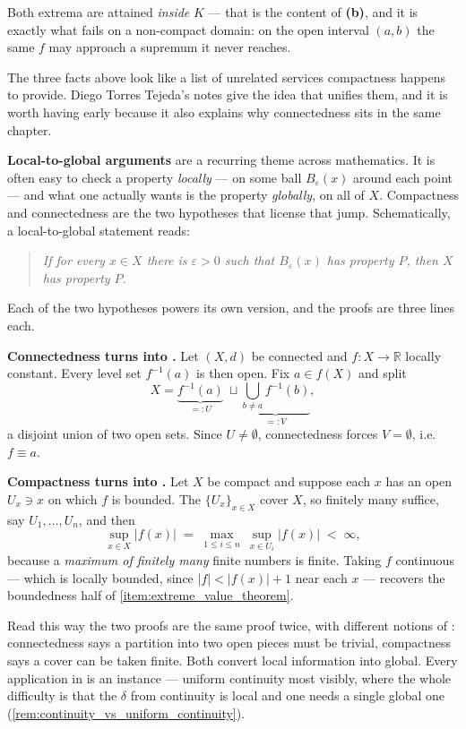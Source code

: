 Both extrema are attained \emph{inside} $K$ --- that is the content of \textbf{(b)}, and it is
exactly what fails on a non-compact domain: on the open interval $(a,b)$ the same $f$ may
approach a supremum it never reaches.

\begin{remark}
\label{rem:local_to_global}
The three facts above look like a list of unrelated services compactness happens to provide.
Diego Torres Tejeda's notes give the idea that unifies them, and it is worth having early
because it also explains why connectedness sits in the same chapter.

\textbf{Local-to-global arguments} are a recurring theme across mathematics. It is often easy to
check a property \emph{locally} --- on some ball $B_\varepsilon(x)$ around each point --- and
what one actually wants is the property \emph{globally}, on all of $X$. Compactness and
connectedness are the two hypotheses that license that jump. Schematically, a local-to-global
statement reads:
\begin{quote}
\itshape
If for every $x \in X$ there is $\varepsilon>0$ such that $B_\varepsilon(x)$ has property $P$,
then $X$ has property $P$.
\end{quote}
Each of the two hypotheses powers its own version, and the proofs are three lines each.

\textbf{Connectedness turns  into .} Let $(X,d)$ be connected
and $f : X \to \mathbb{R}$ locally constant. Every level set $f^{-1}(a)$ is then open. Fix
$a \in f(X)$ and split
\[X = \underbrace{f^{-1}(a)}_{=:U} \ \sqcup \underbrace{\bigcup_{b \neq a}f^{-1}(b)}_{=:V},\]
a disjoint union of two open sets. Since $U \neq \emptyset$, connectedness forces $V=\emptyset$,
i.e.\ $f \equiv a$.

\textbf{Compactness turns  into .} Let $X$ be compact and
suppose each $x$ has an open $U_x \ni x$ on which $f$ is bounded. The $\{U_x\}_{x\in X}$ cover
$X$, so finitely many suffice, say $U_1,\dots,U_n$, and then
\[\sup_{x \in X}|f(x)| \;=\; \max_{1\leq i\leq n}\ \sup_{x \in U_i}|f(x)| \;<\; \infty,\]
because a \emph{maximum of finitely many} finite numbers is finite. Taking $f$ continuous ---
which is locally bounded, since $|f|<|f(x)|+1$ near each $x$ --- recovers the boundedness half
of \cref{item:extreme_value_theorem}.

Read this way the two proofs are the same proof twice, with different notions of : connectedness says a partition into two open pieces must be trivial, compactness says a
cover can be taken finite. Both convert local information into global. Every application in
is an instance --- uniform continuity most visibly, where the whole difficulty is that the
$\delta$ from continuity is local and one needs a single global one
(\cref{rem:continuity_vs_uniform_continuity}).
\end{remark}

